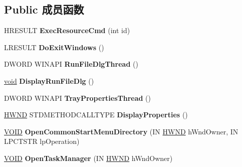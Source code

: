\subsection*{Public 成员函数}
\begin{DoxyCompactItemize}
\item 
\mbox{\label{class_c_tray_window_a92749a8782df7002bd69b698fc8dbafd}} 
H\+R\+E\+S\+U\+LT {\bfseries Exec\+Resource\+Cmd} (int id)
\item 
\mbox{\label{class_c_tray_window_af2121b979e17c4d4a7b0efe21e0ce559}} 
L\+R\+E\+S\+U\+LT {\bfseries Do\+Exit\+Windows} ()
\item 
\mbox{\label{class_c_tray_window_ae0153a9e7baaff188e76c2f47cf4c246}} 
D\+W\+O\+RD W\+I\+N\+A\+PI {\bfseries Run\+File\+Dlg\+Thread} ()
\item 
\mbox{\label{class_c_tray_window_afcde6c2dfe0549f27278225aff6bd30f}} 
\hyperlink{interfacevoid}{void} {\bfseries Display\+Run\+File\+Dlg} ()
\item 
\mbox{\label{class_c_tray_window_a47294ed32faaf428bdd9e3db00bb1687}} 
D\+W\+O\+RD W\+I\+N\+A\+PI {\bfseries Tray\+Properties\+Thread} ()
\item 
\mbox{\label{class_c_tray_window_a724cfc65258ed5086ef3dca41bed617e}} 
\hyperlink{interfacevoid}{H\+W\+ND} S\+T\+D\+M\+E\+T\+H\+O\+D\+C\+A\+L\+L\+T\+Y\+PE {\bfseries Display\+Properties} ()
\item 
\mbox{\label{class_c_tray_window_a934191710917dca747a1e19d98221cb7}} 
\hyperlink{interfacevoid}{V\+O\+ID} {\bfseries Open\+Common\+Start\+Menu\+Directory} (IN \hyperlink{interfacevoid}{H\+W\+ND} h\+Wnd\+Owner, IN L\+P\+C\+T\+S\+TR lp\+Operation)
\item 
\mbox{\label{class_c_tray_window_a093edceb36cebc54bf0c9722a0aefc4b}} 
\hyperlink{interfacevoid}{V\+O\+ID} {\bfseries Open\+Task\+Manager} (IN \hyperlink{interfacevoid}{H\+W\+ND} h\+Wnd\+Owner)
\item 
\mbox{\label{class_c_tray_window_afc5217be6fa071efccac13cf68930e2d}} 

\end{DoxyCompactItemize}
